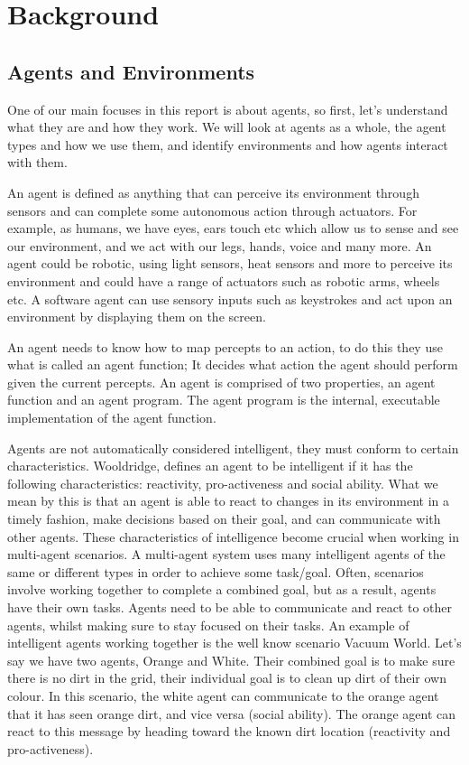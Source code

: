 \documentclass[]{final_report}
\begin{document}
\section{Background}
\subsection{Agents and Environments}\label{Agents and Environments}

One of our main focuses in this report is about agents, so first, let's understand what they are and how they work. We will look at agents as a whole, the agent types and how we use them, and identify environments and how agents interact with them. 

An agent is defined as anything that can perceive its environment through sensors and can complete some autonomous action through actuators. For example, as humans, we have eyes, ears touch etc which allow us to sense and see our environment, and we act with our legs, hands, voice and many more. An agent could be robotic, using light sensors, heat sensors and more to perceive its environment and could have a range of actuators such as robotic arms, wheels etc. A software agent can use sensory inputs such as keystrokes and act upon an environment by displaying them on the screen.

An agent needs to know how to map percepts to an action, to do this they use what is called an agent function; It decides what action the agent should perform given the current percepts. An agent is comprised of two properties, an agent function and an agent program. The agent program is the internal, executable implementation of the agent function. 

Agents are not automatically considered intelligent, they must conform to certain characteristics. Wooldridge\cite{WooldridgeMichael2009AitM}, defines an agent to be intelligent if it has the following characteristics: reactivity, pro-activeness and social ability. What we mean by this is that an agent is able to react to changes in its environment in a timely fashion, make decisions based on their goal, and can communicate with other agents. These characteristics of intelligence become crucial when working in multi-agent scenarios. A multi-agent system uses many intelligent agents of the same or different types in order to achieve some task/goal. Often, scenarios involve working together to complete a combined goal, but as a result, agents have their own tasks. Agents need to be able to communicate and react to other agents, whilst making sure to stay focused on their tasks. An example of intelligent agents working together is the well know scenario Vacuum World. Let's say we have two agents, Orange and White. Their combined goal is to make sure there is no dirt in the grid, their individual goal is to clean up dirt of their own colour. In this scenario, the white agent can communicate to the orange agent that it has seen orange dirt, and vice versa (social ability). The orange agent can react to this message by heading toward the known dirt location (reactivity and pro-activeness).
\end{document}
